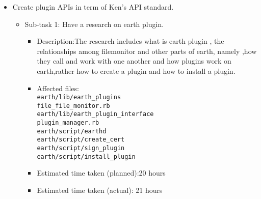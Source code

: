 \documentclass{article}
\begin{document}
\begin{itemize}
	\item Create plugin APIs in term of Ken's API standard.
	     \begin{itemize}
	        \item Sub-task 1: Have a research on earth plugin.
	           \begin{itemize}
				        \item Description:The research includes what is earth plugin , the relationships among filemonitor and other parts of earth, namely ,how they call and work with one another and how plugins work on earth,rather how to create a plugin and how to install a plugin.
                                        \item Affected files: \\
					 \texttt{earth/lib/earth\_plugins\\file\_file\_monitor.rb}\\
                                        \texttt{earth/lib/earth\_plugin\_interface\\plugin\_manager.rb}\\
                                        \texttt{earth/script/earthd}\\
                                        \texttt{earth/script/create\_cert}\\
                                        \texttt{earth/script/sign\_plugin}\\
                                        \texttt{earth/script/install\_plugin} \\
					\item Estimated time taken (planned):20 hours\\
					\item Estimated time taken  (actual): 21 hours\\
				\end{itemize}
                                \end{itemize}  


\end{itemize}
\end{document}
